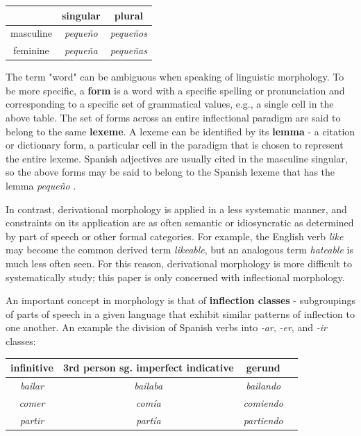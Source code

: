 \begin{center}
\begin{tabular}{|c||c|c|}
\hline
& singular & plural \\
\hline \hline
masculine & \textit{pequeño} & \textit{pequeños} \\
\hline 
feminine & \textit{pequeña} & \textit{pequeñas} \\
\hline
\end{tabular}
\end{center}

 The term "word" can be ambiguous when speaking of linguistic morphology. To be more specific, a \textbf{form} is a word with a specific spelling or pronunciation and corresponding to a specific set of grammatical values, e.g., a single cell in the above table. The set of forms across an entire inflectional paradigm are said to belong to the same \textbf{lexeme}. A lexeme can be identified by its \textbf{lemma} - a citation or dictionary form, a particular cell in the paradigm that is chosen to represent the entire lexeme. Spanish adjectives are usually cited in the masculine singular, so the above forms may be said to belong to the Spanish lexeme that has the lemma \textit{pequeño} \parencite{Hogan2010}.

In contrast, derivational morphology is applied in a less systematic manner, and constraints on its application are as often semantic or idiosyncratic as determined by part of speech or other formal categories. For example, the English verb \textit{like} may become the common derived term \textit{likeable}, but an analogous term \textit{hateable} is much less often seen. For this reason, derivational morphology is more difficult to systematically study; this paper is only concerned with inflectional morphology.

An important concept in morphology is that of \textbf{inflection classes} - subgroupings of parts of speech in a given language that exhibit similar patterns of inflection to one another. An example the division of Spanish verbs into \textit{-ar}, \textit{-er}, and \textit{-ir} classes:

\begin{center}
\begin{tabular}{|c|c|c|c|}
\hline
infinitive & 3rd person sg. imperfect indicative & gerund \\
\hline \hline
\textit{bailar} & \textit{bailaba} & \textit{bailando} \\
\hline 
\textit{comer} & \textit{comía} & \textit{comiendo} \\
\hline 
\textit{partir} & \textit{partía} & \textit{partiendo} \\
\hline 
\end{tabular}
\end{center}

